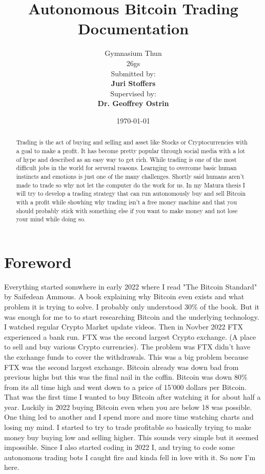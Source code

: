 \documentclass[12pt]{article}
\title{\Huge Autonomous Bitcoin Trading\\\vspace{1cm}\Large Documentation}
\author{
    \Large Gymnasium Thun\\
     26gs\\
    \vspace{1cm}
    \Large Submitted by:\\
    \vspace{0.5cm}
    \textbf{Juri Stoffers}\\
    \vspace{2cm}
    \Large Supervised by:\\
    \vspace{0.5cm}
    \textbf{Dr. Geoffrey Ostrin}
}
\date{\Large \today}
\begin{document}
\begin{titlepage}
\maketitle
\end{titlepage}

\newpage
\begin{abstract}
    \begin{center}
        Trading is the act of buying and selling and asset like Stocks or Cryptocurrencies with a goal to make a profit. It has become pretty popular through social media with a lot of hype and described as an easy way to get rich. While trading is one of the most difficult jobs in the world for serveral reasons. Learnging to overcome basic human instincts and emotions is just one of the many challenges.
        Shortly said humans aren't made to trade so why not let the computer do the work for us. In my Matura thesis I will try to develop a trading strategy that can run autonomously buy and sell Bitcoin with a profit while showhing why trading isn't a free money machine and that you should probably stick with something else if you want to make money and not lose your mind while doing so.
    \end{center}
\end{abstract}


\newpage
{}
\tableofcontents
\newpage




\section{Foreword}
Everything started somwhere in early 2022 where I read "The Bitcoin Standard" by Saifedean Ammous. A book explaining why Bitcoin even exists and what problem it is trying to solve. I probably only understood 30\% of the book. But it was enough for me to to start researching Bitcoin and the underlying technology. I watched regular Crypto Market update videos. Then in Novber 2022 FTX experienced a bank run.
FTX was the second largest Crypto exchange. (A place to sell and buy various Crypto currencies). The problem was FTX didn't have the exchange funds to cover the withdrawals. This was a big problem because FTX was the second largest exchange. Bitcoin already was down bad from previous highs but this was the final nail in the coffin. Bitcoin was down 80\% from its all time high and went down to a price of 15'000 dollars per Bitcoin. 
That was the first time I wanted to buy Bitcoin after watching it for about half a year. Luckily in 2022 buying Bitcoin even when you are below 18 was possible.
One thing led to another and I spend more and more time watching charts and losing my mind. I started to try to trade profitable so basically trying to make money buy buying low and selling higher. 
This sounds very simple but it seemed impossible. Since I also started coding in 2022 I, and trying to code some autonomous trading bots I caught fire and kinda fell in love with it.
So now I'm here.
\end{document}
